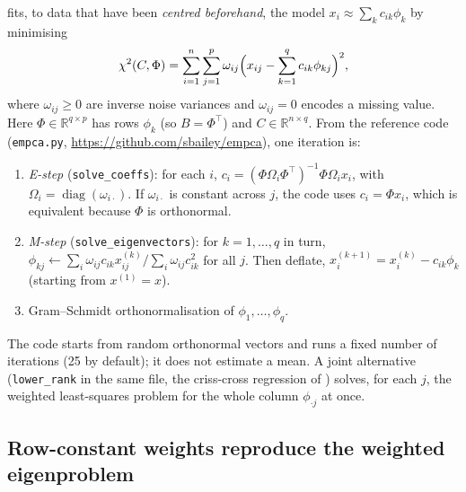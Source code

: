 \documentclass[11pt]{article}
\theoremstyle{definition}
\theoremstyle{remark}
\newcommand{\R}{\mathbb{R}}
\begin{document}
\citet{Bailey2012} fits, to data that have been \emph{centred beforehand}, the model $x_i\approx\sum_kc_{ik}\phi_k$ by minimising
\begin{equation}\label{eq:chi2}
\chi^2(C,\Phi)=\sum_{i=1}^n\sum_{j=1}^p\omega_{ij}\Bigl(x_{ij}-\sum_{k=1}^qc_{ik}\phi_{kj}\Bigr)^2,
\end{equation}
where $\omega_{ij}\ge0$ are inverse noise variances and $\omega_{ij}=0$ encodes a missing value. Here
$\Phi\in\R^{q\times p}$ has rows $\phi_k$ (so $B=\Phi^\top$) and $C\in\R^{n\times q}$. From the reference code
(\texttt{empca.py}, \url{https://github.com/sbailey/empca}), one iteration is:
\begin{enumerate}[label=(\arabic*)]
\item \emph{E-step} (\texttt{solve\_coeffs}): for each $i$,
$c_i=(\Phi\Omega_i\Phi^\top)^{-1}\Phi\Omega_ix_i$, with $\Omega_i=\operatorname{diag}(\omega_{i\cdot})$. If
$\omega_{i\cdot}$ is constant across $j$, the code uses $c_i=\Phi x_i$, which is equivalent because $\Phi$ is orthonormal.
\item \emph{M-step} (\texttt{solve\_eigenvectors}): for $k=1,\dots,q$ in turn,
$\phi_{kj}\gets\sum_i\omega_{ij}c_{ik}x^{(k)}_{ij}/\sum_i\omega_{ij}c_{ik}^2$ for all $j$. Then deflate,
$x^{(k+1)}_{i}=x^{(k)}_i-c_{ik}\phi_k$ (starting from $x^{(1)}=x$).
\item Gram--Schmidt orthonormalisation of $\phi_1,\dots,\phi_q$.
\end{enumerate}
The code starts from random orthonormal vectors and runs a fixed number of iterations (25 by default); it
does not estimate a mean. A joint alternative (\texttt{lower\_rank} in the same file, the criss-cross regression of
\citealp{GabrielZamir1979}) solves, for each $j$, the weighted least-squares problem for the whole column
$\phi_{\cdot j}$ at once.

\subsection{Row-constant weights reproduce the weighted eigenproblem}
\end{document}
